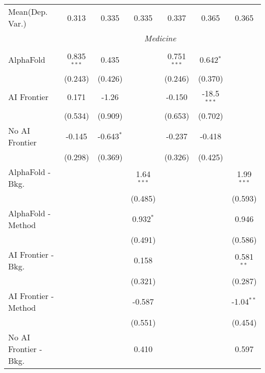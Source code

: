 \begin{tabular}{lcccccc}
Mean(Dep. Var.) & 0.313 & 0.335 & 0.335 & 0.337 & 0.365 & 0.365 \\
 & \multicolumn{6}{c}{\textit{Medicine}} \\ \\
   AlphaFold               & 0.835$^{***}$ & 0.435        &              & 0.751$^{***}$ & 0.642$^{*}$   &   \\   
                           & (0.243)       & (0.426)      &              & (0.246)       & (0.370)       &   \\   
   AI Frontier             & 0.171         & -1.26        &              & -0.150        & -18.5$^{***}$ &   \\   
                           & (0.534)       & (0.909)      &              & (0.653)       & (0.702)       &   \\   
   No AI Frontier          & -0.145        & -0.643$^{*}$ &              & -0.237        & -0.418        &   \\   
                           & (0.298)       & (0.369)      &              & (0.326)       & (0.425)       &   \\   
   AlphaFold - Bkg.        &               &              & 1.64$^{***}$ &               &               & 1.99$^{***}$\\   
                           &               &              & (0.485)      &               &               & (0.593)\\   
   AlphaFold - Method      &               &              & 0.932$^{*}$  &               &               & 0.946\\   
                           &               &              & (0.491)      &               &               & (0.586)\\   
   AI Frontier - Bkg.      &               &              & 0.158        &               &               & 0.581$^{**}$\\   
                           &               &              & (0.321)      &               &               & (0.287)\\   
   AI Frontier - Method    &               &              & -0.587       &               &               & -1.04$^{**}$\\   
                           &               &              & (0.551)      &               &               & (0.454)\\   
   No AI Frontier - Bkg.   &               &              & 0.410        &               &               & 0.597\\   

\end{tabular}
